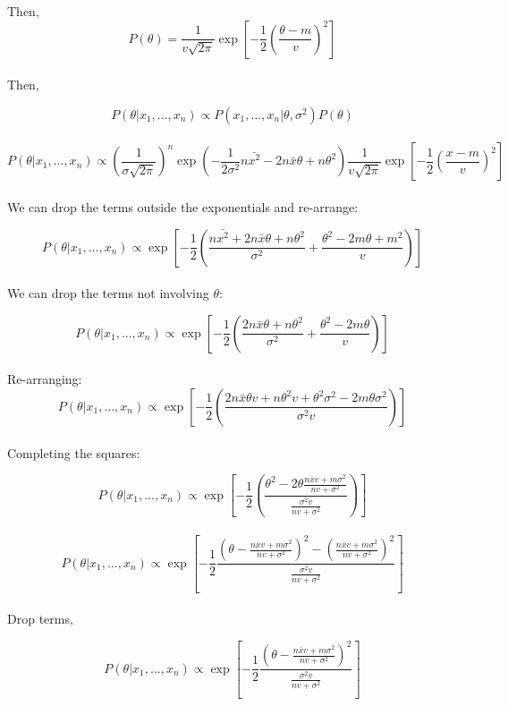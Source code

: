 \documentclass[12pt]{amsart}
\begin{document}
Then, \\
$$ P(\theta) = \frac{1}{v \sqrt{2\pi }}  \exp\left[-\frac{1}{2}\left(\frac{\theta-m}{v}\right)^2\right]$$\\

Then,

$$P(\theta|x_1, ...,x_n) \propto P(x_1, ...,x_n|\theta, \sigma^2) P(\theta)$$\\

$$P(\theta|x_1, ...,x_n) \propto \left(\frac{1}{\sigma \sqrt{2\pi }}\right)^n \exp\left(-\frac{1}{2\sigma^2}n\bar{x^2} - 2n\bar{x}\theta +n\theta^2\right)\frac{1}{v \sqrt{2\pi }}  \exp\left[-\frac{1}{2}\left(\frac{x-m}{v}\right)^2\right]$$\\


We can drop the terms outside the exponentials and re-arrange:

$$P(\theta|x_1, ...,x_n) \propto  \exp\left[-\frac{1}{2}\left(\frac{n\bar{x^2}+2n\bar{x}\theta+n\theta^2}{\sigma^2} + \frac{\theta^2-2m\theta+m^2}{v}\right)\right] $$\\

We can drop the terms not involving $\theta$:

$$P(\theta|x_1, ...,x_n) \propto  \exp\left[-\frac{1}{2}\left(\frac{2n\bar{x}\theta+n\theta^2}{\sigma^2} + \frac{\theta^2-2m\theta}{v}\right)\right] $$\\

Re-arranging:
$$P(\theta|x_1, ...,x_n) \propto  \exp\left[-\frac{1}{2}\left(\frac{2n\bar{x}\theta v+n\theta^2v+\theta^2\sigma^2-2m\theta\sigma^2}{\sigma^2v} \right)\right] $$\\

Completing the squares:


$$P(\theta|x_1, ...,x_n) \propto  \exp\left[-\frac{1}{2}\left(\frac{\theta^2 - 2\theta\frac{n\bar{x}v+m\sigma^2}{nv+\sigma^2}}{\frac{\sigma^2v}{nv+\sigma^2}} \right)\right] $$\\

$$P(\theta|x_1, ...,x_n) \propto  \exp\left[-\frac{1}{2}\frac{\left(\theta - \frac{n\bar{x}v+m\sigma^2}{nv+\sigma^2}\right)^2 - \left(\frac{n\bar{x}v+m\sigma^2}{nv+\sigma^2}\right)^2 }{\frac{\sigma^2v}{nv+\sigma^2}} \right] $$\\

Drop terms,

$$P(\theta|x_1, ...,x_n) \propto  \exp\left[-\frac{1}{2}\frac{\left(\theta - \frac{n\bar{x}v+m\sigma^2}{nv+\sigma^2}\right)^2 }{\frac{\sigma^2v}{nv+\sigma^2}} \right] $$\\
\end{document}
